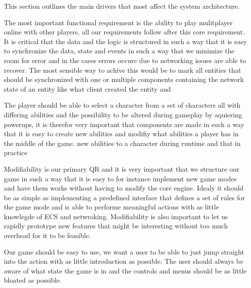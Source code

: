 	This section outlines the main drivers that most affect the system architecture.

	The most important functional requirement is the ability to play mulitplayer online with other 
	players, all our requirements follow after this core requirement. It is critical that the data and the logic is
	structured in such a way that it is easy to synchronize the data, state and events in such a way that we minimize the room for error
	and in the cases errors occure due to networking issues are able to recover. The most sensible way to achive this would be to mark all entities
	that should be synchronized with one or multiple components containing the network state of an entity like what client created the entity and

	The player should be able to select a character from a set of characters all with differing abilities and the possibility to be altered during gameplay
	by aquiering powerups, it is therefor very important that components are made in such a way that it is easy to create new abilities and modifiy
	what abilities a player has in the middle of the game. new abilities to a character during runtime and that in practice 

	Modifiability is our primary QR and it is very important that we structure our game in such a way that it is easy to for instance implement new game modes and have them works without
	having to modify the core engine. Idealy it should be as simple as implementing a predefined interface that defines a set of rules for the game mode and is able to performe meaningful actions with as little
	knowlegde of ECS and netwroking. Modifiability is also important to let us rapidly prototype new features that might be interesting without too much overhead for it to be feasible.
	
	Our game should be easy to use, we want a user to be able to just jump straight into the action with as little introduction as possible. The user should always be aware of what state
	the game is in and the controls and menus should be as little bloated as possible.
	
